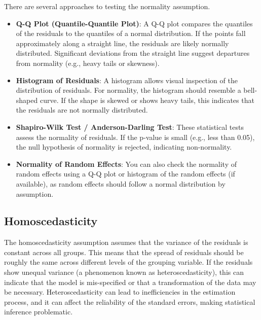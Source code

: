 There are several approaches to testing the normality assumption.
\begin{itemize}
\item \textbf{Q-Q Plot (Quantile-Quantile Plot)}: A Q-Q plot compares the quantiles of the residuals to the quantiles of a normal distribution. If the points fall approximately along a straight line, the residuals are likely normally distributed. Significant deviations from the straight line suggest departures from normality (e.g., heavy tails or skewness).

\item \textbf{Histogram of Residuals}: A histogram allows visual inspection of the distribution of residuals. For normality, the histogram should resemble a bell-shaped curve. If the shape is skewed or shows heavy tails, this indicates that the residuals are not normally distributed.

\item \textbf{Shapiro-Wilk Test / Anderson-Darling Test}: These statistical tests assess the normality of residuals. If the p-value is small (e.g., less than 0.05), the null hypothesis of normality is rejected, indicating non-normality.

\item \textbf{Normality of Random Effects}: You can also check the normality of random effects using a Q-Q plot or histogram of the random effects (if available), as random effects should follow a normal distribution by assumption.
\end{itemize}

\subsection*{Homoscedasticity}
The homoscedasticity assumption assumes that the variance of the residuals is constant across all groups. This means that the spread of residuals should be roughly the same across different levels of the grouping variable. If the residuals show unequal variance (a phenomenon known as heteroscedasticity), this can indicate that the model is mis-specified or that a transformation of the data may be necessary. Heteroscedasticity can lead to inefficiencies in the estimation process, and it can affect the reliability of the standard errors, making statistical inference problematic.

